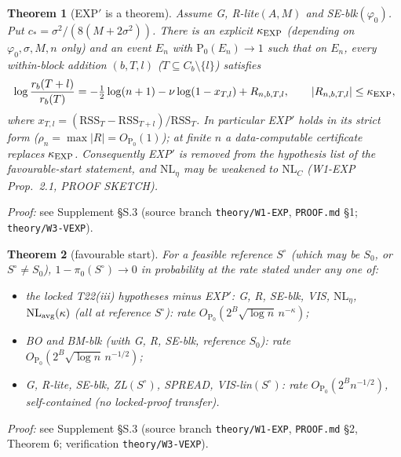 \documentclass[11pt]{article}
\newtheorem{thmpart}{Theorem}[theorem]
\theoremstyle{definition}
\theoremstyle{remark}
\renewcommand{\Pr}{\mathrm{P}}
\newcommand{\Sz}{S_0}
\begin{document}
\begin{thmpart}[EXP$'$ is a theorem]\label{thm:EXP}
Assume G, R-lite$(A,M)$ and SE-blk$(\varphi_0)$. Put $c_*=\sigma^2/(8(M+2\sigma^2))$. There is an explicit $\kappa_{\rm EXP}$
(depending on $\varphi_0,\sigma,M,n$ only) and an event $E_n$ with $\Pr_0(E_n)\to1$ such that on $E_n$, \emph{every}
within-block addition $(b,T,l)$ ($T\subseteq C_b\setminus\{l\}$) satisfies
\[
\log\frac{r_b(T+l)}{r_b(T)}=-\tfrac12\log(n+1)-\nu\log(1-x_{T,l})+R_{n,b,T,l},\qquad |R_{n,b,T,l}|\le\kappa_{\rm EXP},
\]
where $x_{T,l}=(\mathrm{RSS}_T-\mathrm{RSS}_{T+l})/\mathrm{RSS}_T$. In particular EXP$'$ holds in its strict form ($\rho_n=\max|R|=O_{\Pr_0}(1)$);
at finite $n$ a data-computable certificate replaces $\kappa_{\rm EXP}$. Consequently EXP$'$ is removed from the hypothesis list of the
favourable-start statement, and $\mathrm{NL}_\eta$ may be weakened to $\mathrm{NL}_C$ (W1-EXP Prop.~2.1, PROOF SKETCH).
\end{thmpart}
\noindent\emph{Proof:} see Supplement \S S.3 (source branch \texttt{theory/W1-EXP}, \texttt{PROOF.md} \S1; \texttt{theory/W3-VEXP}).

\begin{thmpart}[favourable start]\label{thm:favourable}
For a feasible reference $S^\circ$ (which may be $\Sz$, or $S^\circ\ne\Sz$), $1-\pi_0(S^\circ)\to0$ in probability at the rate
stated under any one of:
\begin{itemize}
\item[(F1)] the locked T22(iii) hypotheses minus EXP$'$: G, R, SE-blk, VIS, $\mathrm{NL}_\eta$, $\mathrm{NL}_{\rm avg}(\kappa)$ (all at reference $S^\circ$): rate $O_{\Pr_0}(2^B\sqrt{\log n}\,n^{-\kappa})$;
\item[(F2)] BO and BM-blk (with G, R, SE-blk, reference $\Sz$): rate $O_{\Pr_0}(2^B\sqrt{\log n}\,n^{-1/2})$;
\item[(F3)] G, R-lite, SE-blk, ZL$(S^\circ)$, SPREAD, VIS-lin$(S^\circ)$: rate $O_{\Pr_0}(2^B n^{-1/2})$, self-contained (no locked-proof transfer).
\end{itemize}
\end{thmpart}
\noindent\emph{Proof:} see Supplement \S S.3 (source branch \texttt{theory/W1-EXP}, \texttt{PROOF.md} \S2, Theorem 6; verification \texttt{theory/W3-VEXP}).
\end{document}
